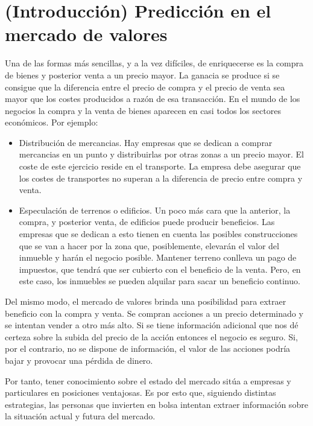 \section{(Introducci\'on) Predicci\'on en el mercado de valores}

Una de las formas más sencillas, y a la vez dif\'iciles, de enriquecerse es la compra de bienes y posterior venta a un precio mayor. La ganacia se produce si se consigue que la diferencia entre el precio de compra y el precio de venta sea mayor que los costes producidos a raz\'on de esa transacci\'on. En el mundo de los negocios la compra y la venta de bienes aparecen en casi todos los sectores econ\'omicos. Por ejemplo:

\begin{itemize}
    \item Distribuci\'on de mercancias. Hay empresas que se dedican a comprar mercancias en un punto y distribuirlas por otras zonas a un precio mayor. El coste de este ejercicio reside en el transporte. La empresa debe asegurar que los costes de transportes no superan a la diferencia de precio entre compra y venta.
    
    \item Especulaci\'on de terrenos o edificios. Un poco m\'as cara que la anterior, la compra, y posterior venta, de edificios puede producir beneficios. Las empresas que se dedican a esto tienen en cuenta las posibles construcciones que se van a hacer por la zona que, posiblemente, elevar\'an el valor del inmueble y har\'an el negocio posible. Mantener terreno conlleva un pago de impuestos, que tendr\'a que ser cubierto con el beneficio de la venta. Pero, en este caso, los inmuebles se pueden alquilar para sacar un beneficio continuo.
\end{itemize}

Del mismo modo, el mercado de valores brinda una posibilidad para extraer beneficio con la compra y venta. Se compran acciones a un precio determinado y se intentan vender a otro m\'as alto. Si se tiene informaci\'on adicional que nos d\'e certeza sobre la subida del precio de la acci\'on entonces el negocio es seguro. Si, por el contrario, no se dispone de informaci\'on, el valor de las acciones podr\'ia bajar y provocar una p\'erdida de dinero.

Por tanto, tener conocimiento sobre el estado del mercado sit\'ua a empresas y particulares en posiciones ventajosas. Es por esto que, siguiendo distintas estrategias, las personas que invierten en bolsa intentan extraer informaci\'on sobre la situaci\'on actual y futura del mercado.\\

